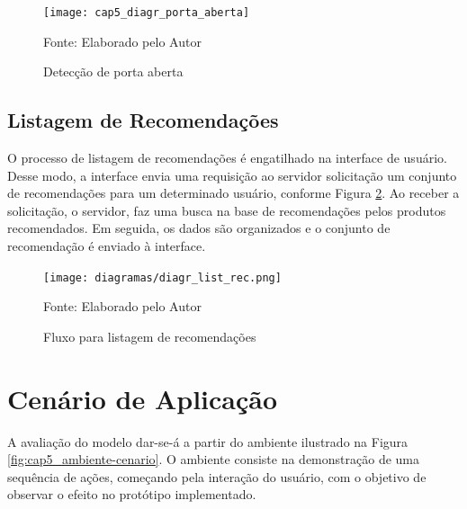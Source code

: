 \begin{figure}[H]
    \caption{Detecção de porta aberta}
    \label{fig:cap5_diagr_porta_aberta}
    \texttt{[image: cap5\_diagr\_porta\_aberta]}
    
    \footnotesize{Fonte: Elaborado pelo Autor}
\end{figure}

\subsection{Listagem de Recomendações} \label{ssec:listagem_rec}

O processo de listagem de recomendações é engatilhado na interface de usuário. Desse modo, a interface envia uma requisição ao servidor solicitação um conjunto de recomendações para um determinado usuário, conforme Figura \ref{fig:cap5_diagr_lista_rec}.  Ao receber a solicitação, o servidor, faz uma busca na base de recomendações pelos produtos recomendados. Em seguida, os dados são organizados e o conjunto de recomendação é enviado à interface.

\begin{figure}[H]
    \caption{Fluxo para listagem de recomendações}
    \label{fig:cap5_diagr_lista_rec}
    \texttt{[image: diagramas/diagr\_list\_rec.png]}
    
    \footnotesize{Fonte: Elaborado pelo Autor}
\end{figure}


\section{Cenário de Aplicação}

A avaliação do modelo dar-se-á a partir do ambiente ilustrado na Figura \ref{fig:cap5_ambiente-cenario}. O ambiente consiste na demonstração de uma sequência de ações, começando pela interação do usuário, com o objetivo de observar o efeito no protótipo implementado.


